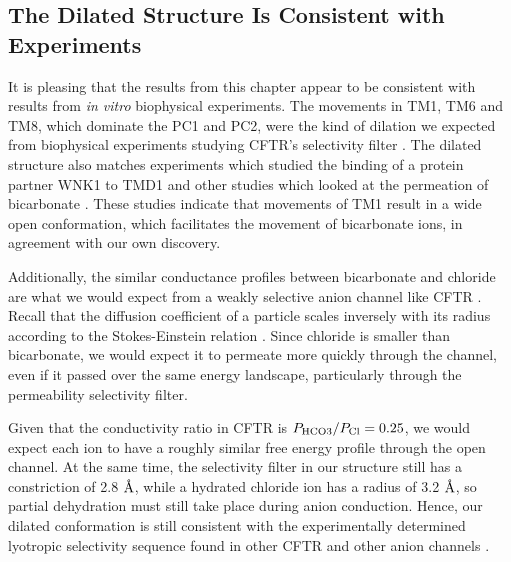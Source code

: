 
\subsection{The Dilated Structure Is Consistent with Experiments}
It is pleasing that the results from this chapter appear to be consistent with results from \textit{in vitro} biophysical experiments. The movements in TM1, TM6 and TM8, which dominate the PC1 and PC2, were the kind of dilation we expected from biophysical experiments studying CFTR's selectivity filter \cite{negoda2019,linsdell2016}. The dilated structure also matches experiments which studied the binding of a protein partner WNK1 to TMD1 and other studies which looked at the permeation of bicarbonate \cite{jun2016, kim2019}. These studies indicate that movements of TM1 result in a wide open conformation, which facilitates the movement of bicarbonate ions, in agreement with our own discovery.  

Additionally, the similar conductance profiles between bicarbonate and chloride are what we would expect from a weakly selective anion channel like CFTR \cite{linsdell2016}. Recall that the diffusion coefficient of a particle scales inversely with its radius according to the Stokes-Einstein relation \cite{miller1924}. Since chloride is smaller than bicarbonate, we would expect it to permeate more quickly through the channel, even if it passed over the same energy landscape, particularly through the permeability selectivity filter. 

Given that the conductivity ratio in CFTR is $P_{\rm{HCO3}}/P_{\rm{Cl}}=0.25$, we would expect each ion to have a roughly similar free energy profile through the open channel. At the same time, the selectivity filter in our structure still has a constriction of 2.8 $\textup{\AA}$, while a hydrated chloride ion has a radius of 3.2 $\textup{\AA}$, so partial dehydration must still take place during anion conduction. Hence, our dilated conformation is still consistent with the experimentally determined lyotropic selectivity sequence found in other CFTR and other anion channels \cite{linsdell2016}. 

